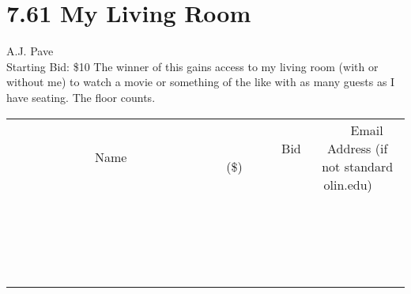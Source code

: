 \documentclass[11pt]{article}
\begin{document}
\section*{7.61 My Living Room}
A.J. Pave
\\
Starting Bid: \$10
\newline
The winner of this gains access to my living room (with or without me) to watch a movie or something of the like with as many guests as I have seating. The floor counts.
\\[3ex]
\begin{tabular}{c c c}
~~~~~~~~~~~~~Name~~~~~~~~~~~~~ & ~~~~~~~~~Bid (\$)~~~~~~~~~  & ~~~Email Address (if not standard olin.edu)~~~\\
 & & \\
\hline
 & & \\
\hline
 & & \\
\hline
 & & \\
\hline
 & & \\
\hline
 & & \\
\hline
 & & \\
\hline
 & & \\
\hline
 & & \\
\hline
 & & \\
\hline
 & & \\
\hline
 & & \\
\hline
 & & \\
\hline
 & & \\
\hline
 & & \\
\hline
 & & \\
\hline
 & & \\
\hline
 & & \\
\hline
 & & \\
\hline
\end{tabular}
\newpage
\end{document}
